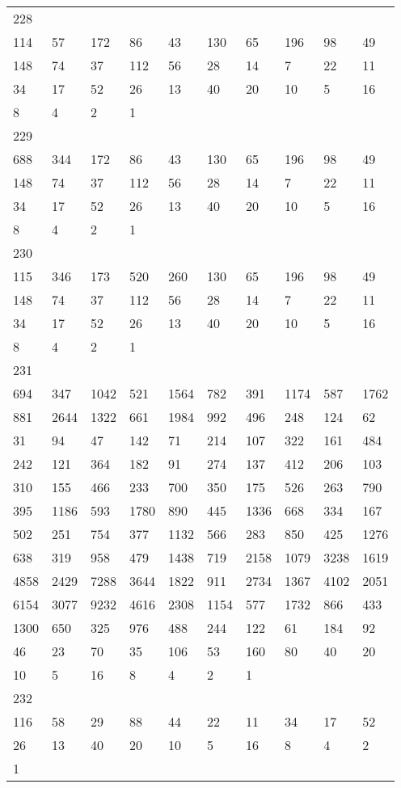 \begin{longtable}{*{10}{l}}
228&&&&&&&&&\\
114& 57& 172& 86& 43& 130& 65& 196& 98& 49\\
148& 74& 37& 112& 56& 28& 14& 7& 22& 11\\
34& 17& 52& 26& 13& 40& 20& 10& 5& 16\\
8& 4& 2& 1& \\

229&&&&&&&&&\\
688& 344& 172& 86& 43& 130& 65& 196& 98& 49\\
148& 74& 37& 112& 56& 28& 14& 7& 22& 11\\
34& 17& 52& 26& 13& 40& 20& 10& 5& 16\\
8& 4& 2& 1& \\

230&&&&&&&&&\\
115& 346& 173& 520& 260& 130& 65& 196& 98& 49\\
148& 74& 37& 112& 56& 28& 14& 7& 22& 11\\
34& 17& 52& 26& 13& 40& 20& 10& 5& 16\\
8& 4& 2& 1& \\

231&&&&&&&&&\\
694& 347& 1042& 521& 1564& 782& 391& 1174& 587& 1762\\
881& 2644& 1322& 661& 1984& 992& 496& 248& 124& 62\\
31& 94& 47& 142& 71& 214& 107& 322& 161& 484\\
242& 121& 364& 182& 91& 274& 137& 412& 206& 103\\
310& 155& 466& 233& 700& 350& 175& 526& 263& 790\\
395& 1186& 593& 1780& 890& 445& 1336& 668& 334& 167\\
502& 251& 754& 377& 1132& 566& 283& 850& 425& 1276\\
638& 319& 958& 479& 1438& 719& 2158& 1079& 3238& 1619\\
4858& 2429& 7288& 3644& 1822& 911& 2734& 1367& 4102& 2051\\
6154& 3077& 9232& 4616& 2308& 1154& 577& 1732& 866& 433\\
1300& 650& 325& 976& 488& 244& 122& 61& 184& 92\\
46& 23& 70& 35& 106& 53& 160& 80& 40& 20\\
10& 5& 16& 8& 4& 2& 1& \\

232&&&&&&&&&\\
116& 58& 29& 88& 44& 22& 11& 34& 17& 52\\
26& 13& 40& 20& 10& 5& 16& 8& 4& 2\\
1& \\


\end{longtable}
